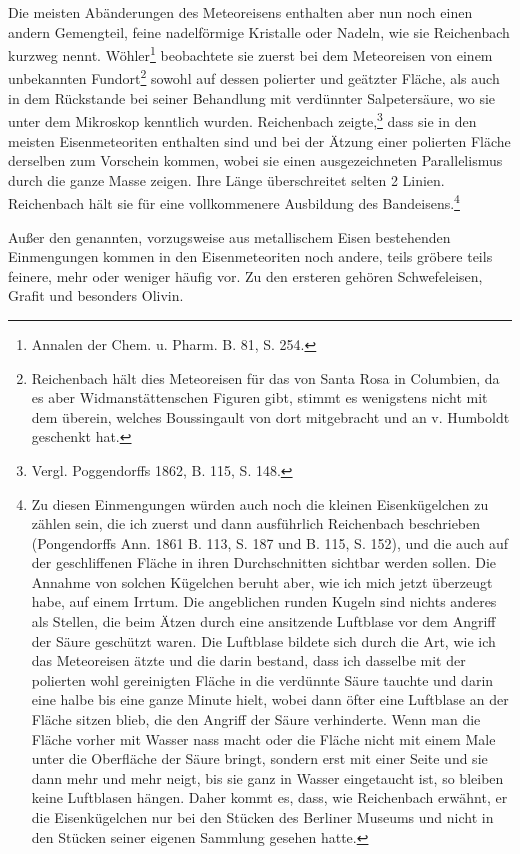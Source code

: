 \documentclass[a4paper, 11pt, oneside]{article}
\begin{document}
Die meisten Abänderungen des Meteoreisens enthalten aber nun noch einen andern Gemengteil, feine nadelförmige Kristalle oder Nadeln, wie sie Reichenbach kurzweg nennt. Wöhler\footnote{Annalen der Chem. u. Pharm. B. 81, S. 254.} beobachtete sie zuerst bei dem Meteoreisen von einem unbekannten Fundort\footnote{Reichenbach hält dies Meteoreisen für das von Santa Rosa in Columbien, da es aber Widmanstättenschen Figuren gibt, stimmt es wenigstens nicht mit dem überein, welches Boussingault von dort mitgebracht und an v. Humboldt geschenkt hat.} sowohl auf dessen polierter und geätzter Fläche, als auch in dem Rückstande bei seiner Behandlung mit verdünnter Salpetersäure, wo sie unter dem Mikroskop kenntlich wurden. Reichenbach zeigte,\footnote{Vergl. Poggendorffs 1862, B. 115, S. 148.} dass sie in den meisten Eisenmeteoriten enthalten sind und bei der Ätzung einer polierten Fläche derselben zum Vorschein kommen, wobei sie einen ausgezeichneten Parallelismus durch die ganze Masse zeigen. Ihre Länge überschreitet selten 2 Linien. Reichenbach hält sie für eine vollkommenere Ausbildung des Bandeisens.\footnote{Zu diesen Einmengungen würden auch noch die kleinen Eisenkügelchen zu zählen sein, die ich zuerst und dann ausführlich Reichenbach beschrieben (Pongendorffs Ann. 1861 B. 113, S. 187 und B. 115, S. 152), und die auch auf der geschliffenen Fläche in ihren Durchschnitten sichtbar werden sollen. Die Annahme von solchen Kügelchen beruht aber, wie ich mich jetzt überzeugt habe, auf einem Irrtum. Die angeblichen runden Kugeln sind nichts anderes als Stellen, die beim Ätzen durch eine ansitzende Luftblase vor dem Angriff der Säure geschützt waren. Die Luftblase bildete sich durch die Art, wie ich das Meteoreisen ätzte und die darin bestand, dass ich dasselbe mit der polierten wohl gereinigten Fläche in die verdünnte Säure tauchte und darin eine halbe bis eine ganze Minute hielt, wobei dann öfter eine Luftblase an der Fläche sitzen blieb, die den Angriff der Säure verhinderte. Wenn man die Fläche vorher mit Wasser nass macht oder die Fläche nicht mit einem Male unter die Oberfläche der Säure bringt, sondern erst mit einer Seite und sie dann mehr und mehr neigt, bis sie ganz in Wasser eingetaucht ist, so bleiben keine Luftblasen hängen. Daher kommt es, dass, wie Reichenbach erwähnt, er die Eisenkügelchen nur bei den Stücken des Berliner Museums und nicht in den Stücken seiner eigenen Sammlung gesehen hatte.}

Außer den genannten, vorzugsweise aus metallischem Eisen bestehenden Einmengungen kommen in den Eisenmeteoriten noch andere, teils gröbere teils feinere, mehr oder weniger häufig vor. Zu den ersteren gehören Schwefeleisen, Grafit und besonders Olivin.
\end{document}
